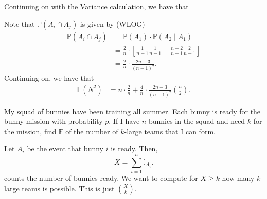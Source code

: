 
Continuing on with the Variance calculation, we have that 
\begin{tmpexplanation}
	Note that \( \mathbb{P}(A_i \cap A_j) \) is given by (WLOG)
	\begin{align*}
		\mathbb{P}(A_i \cap A_j) &= \mathbb{P}(A_1) \cdot \mathbb{P}(A_2 \mid A_1) \\
														 &= \frac{2}{n} \cdot \left[ \frac{1}{n-1} \frac{1}{n-1} + \frac{n-2}{n-1} \frac{2}{n-1} \right] \\
														 &= \frac{2}{n} \cdot \frac{2n-3}{(n-1)^{2} }
	.\end{align*}
	Continuing on, we have that
	\begin{align*}
		\mathbb{E}(N^{2} ) &= n \cdot \frac{2}{n} + \frac{4}{n}\cdot \frac{2n-3}{(n-1)^{2} } \binom{n}{2}
	.\end{align*}
\end{tmpexplanation}

\begin{eg}
	My squad of bunnies have been training all summer. Each bunny is ready for the bunny mission with probability \( p \). If I have \( n \) bunnies in the squad and need \( k \) for the mission, find \( \mathbb{E} \) of the number of \( k \)-large teams that I can form.
\end{eg}
\begin{explanation}
	Let \( A_i  \) be the event that bunny \( i \) is ready. Then, \[
		X = \sum_{i=1}^{n} \mathbb{I}_{A_i}
	.\] counts the number of bunnies ready. We want to compute for \( X \ge k \) how many \( k \)-large teams is possible. This is just \( \binom{X}{k} \).
\end{explanation}
